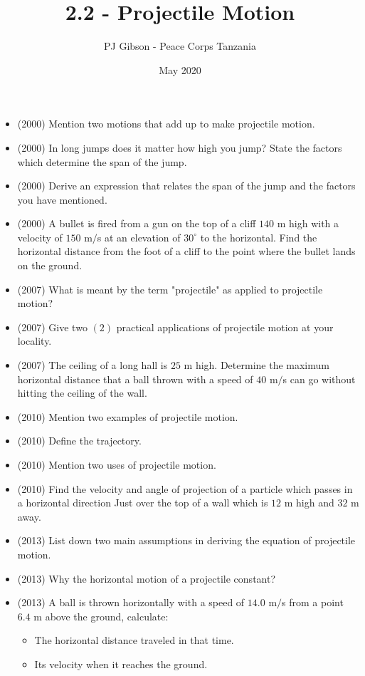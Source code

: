 \documentclass{article}
\title{\textbf{2.2 - Projectile Motion}}
\author{PJ Gibson - Peace Corps Tanzania}
\date{May 2020}
\begin{document}
\maketitle

\begin{itemize}
\item (2000)  Mention two motions that add up to make projectile motion.
\item (2000)  In long jumps does it matter how high you jump? State the factors which determine the span of the jump. 
\item (2000)  Derive an expression that relates the span of the jump and the factors you have mentioned.
\item (2000)  A bullet is fired from a gun on the top of a cliff $ 140$ m high with a velocity of $ 150$ m$/$s at an elevation of $ 30^{\circ}$ to the horizontal. Find the horizontal distance from the foot of a cliff to the point where the bullet lands on the ground.
\item (2007)  What is meant by the term "projectile" as applied to projectile motion?
\item (2007)  Give two $ (2)$ practical applications of projectile motion at your locality.
\item (2007)  The ceiling of a long hall is $ 25$ m high.  Determine the maximum horizontal distance that a ball thrown with a speed of $ 40$ m$/$s can go without hitting the ceiling of the wall.
\item (2010)  Mention two examples of projectile motion. 
\item (2010)  Define the trajectory. 
\item (2010)  Mention two uses of projectile motion.
\item (2010)  Find the velocity and angle of projection of a particle which passes in a horizontal direction Just over the top of a wall which is $ 12$ m high and $ 32$ m away. 
\item (2013)  List down two main assumptions in deriving the equation of projectile motion.
\item (2013)  Why the horizontal motion of a projectile constant? 
\item (2013)  A ball is thrown horizontally with a speed of $ 14.0$ m$/$s from a point $ 6.4$ m above the ground, calculate:
 \begin{itemize}
\item The horizontal distance traveled in that time.
\item Its velocity when it reaches the ground.

\end{itemize}
\end{itemize}
\end{document}
